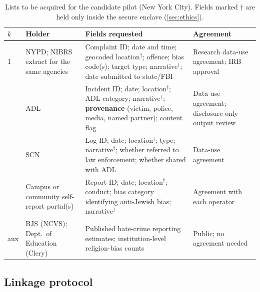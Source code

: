 \begin{table}[tbp]
\centering
\caption{Lists to be acquired for the candidate pilot (New York City). Fields marked $\dagger$ are held only inside the secure enclave (\cref{sec:ethics}).}\label{tab:plan-lists}
\footnotesize
\setlength{\tabcolsep}{4pt}
\renewcommand{\arraystretch}{1.15}
\begin{tabularx}{\textwidth}{@{}l>{\raggedright\arraybackslash}p{2.4cm}>{\raggedright\arraybackslash}X>{\raggedright\arraybackslash}p{3.3cm}@{}}
\toprule
$k$ & Holder & Fields requested & Agreement \\
\midrule
1 & NYPD; NIBRS extract for the same agencies & Complaint ID; date and time; geocoded location$^\dagger$; offence; bias code(s); target type; narrative$^\dagger$; date submitted to state/FBI & Research data-use agreement; IRB approval \\
\addlinespace
2 & ADL & Incident ID; date; location$^\dagger$; ADL category; narrative$^\dagger$; \textbf{provenance} (victim, police, media, named partner); content flag & Data-use agreement; disclosure-only output review \\
\addlinespace
3 & SCN & Log ID; date; location$^\dagger$; type; narrative$^\dagger$; whether referred to law enforcement; whether shared with ADL & Data-use agreement \\
\addlinespace
4 & Campus or community self-report portal(s) & Report ID; date; location$^\dagger$; conduct; bias category identifying anti-Jewish bias; narrative$^\dagger$ & Agreement with each operator \\
\addlinespace
aux & BJS (NCVS); Dept.\ of Education (Clery) & Published hate-crime reporting estimates; institution-level religion-bias counts & Public; no agreement needed \\
\bottomrule
\end{tabularx}
\end{table}
\subsection{Linkage protocol}\label{sec:plan-linkage}

